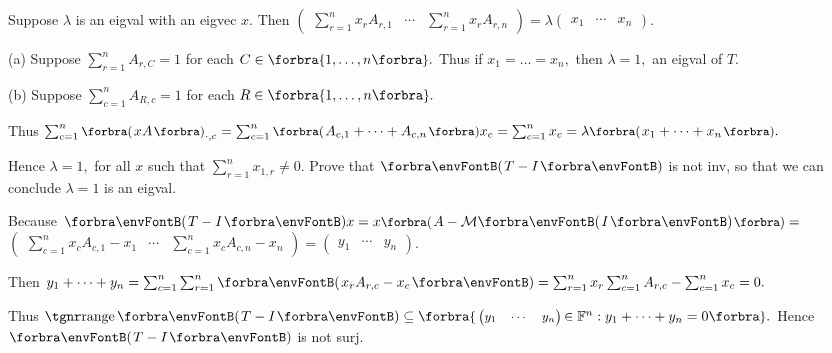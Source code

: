 \documentclass[a4paper, 11pt, UTF8]{article}
\begin{document}
\begin{large}
\par\quad
Suppose $\lambda$ is an eigval with an eigvec $x.$ Then {\normalsize$\begin{pmatrix} \sum_{r=1}^n x_r A_{r,1} &\cdots & \sum_{r=1}^n x_r A_{r,n}\end{pmatrix}$}${}=\lambda${\normalsize$\begin{pmatrix} x_1 & \cdots & x_n\end{pmatrix}$}.\vspace{4pt}\par\quad
(a) Suppose $\sum_{r=1}^n A_{r,C}=1$ for each $C\in\Bra{1,\dots,n}.$ Thus if $x_1=\dots=x_n,$ then $\lambda=1,$ an eigval of $T.$\vspace{4pt}\par\quad
(b) Suppose $\sum_{c=1}^n A_{R,c}=1$ for each $R\in\Bra{1,\dots,n}.$\vspace{2pt}\par\quad\Hb
Thus $\sum_{c=1}^n \BigPar{xA}_{\cdot,c}=\sum_{c=1}^n\BigPar{A_{c,1}+\dots+A_{c,n}}x_c=\sum_{c=1}^n x_c=\lambda\BigPar{x_1+\dots+x_n}.$\vspace{2pt}\par\quad\Hb
Hence $\lambda=1,$ for all $x$ such that $\sum_{r=1}^n x_{1,r}\neq 0.$\PfEnd\vspace{6pt}\quad\Hb
\Or Prove that $\Par{T-I}$ is not inv, so that we can conclude $\lambda=1$ is an eigval.\par\quad\Hb
Because $\Par{T-I}x=x\BigPar{A-\Mt{I}}={}${\normalsize$\begin{pmatrix} \sum_{c=1}^n x_c A_{c,1}-x_1 &\cdots & \sum_{c=1}^n x_c A_{c,n}-x_n\end{pmatrix}$}${}={}${\normalsize$\begin{pmatrix} y_1 & \cdots & y_n\end{pmatrix}$}.\vspace{2pt}\par\quad\Hb
Then $y_1+\dots+y_n=\sum_{c=1}^n\sum_{r=1}^n\Par{x_r A_{r,c}-x_c}=\sum_{r=1}^n x_r\sum_{c=1}^n A_{r,c}-\sum_{c=1}^n x_c=0.$\par\vspace{4pt}\quad\Hb
Thus $\range\Par{T-I}\subseteq\Bra{\,${\small$\begin{pmatrix}
			y_1 & \cdots & y_n
		\end{pmatrix}$}$\,\in\Fbb^n:y_1+\dots+y_n=0}.$ Hence $\Par{T-I}$ is not surj.\PfEnd
\SepLine


\end{large}
\end{document}
